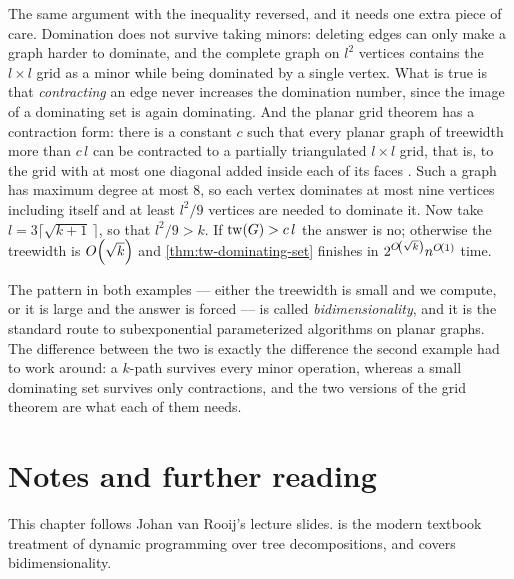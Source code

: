 \begin{example}\label{ex:planar-k-dominating}
The same argument with the inequality reversed, and it needs one extra piece of
care. Domination does not survive taking minors: deleting edges can only make a
graph harder to dominate, and the complete graph on $l^2$ vertices contains the
$l \times l$ grid as a minor while being dominated by a single vertex. What is
true is that \emph{contracting} an edge never increases the domination number,
since the image of a dominating set is again dominating. And the planar grid
theorem has a contraction form: there is a constant $c$ such that every planar
graph of treewidth more than $c\,l$ can be contracted to a partially
triangulated $l \times l$ grid, that is, to the grid with at most one diagonal
added inside each of its faces \citep{FominGolovachThilikos2011}. Such a graph
has maximum degree at most $8$, so each vertex dominates at most nine vertices
including itself and at least $l^2/9$ vertices are needed to dominate it. Now
take $l = 3\lceil \sqrt{k+1}\, \rceil$, so that $l^2/9 > k$. If
$\mathrm{tw}(G) > c\,l$ the answer is no; otherwise the treewidth is $O\!\left(\sqrt k\right)$
and \cref{thm:tw-dominating-set} finishes in $2^{O\!\left(\sqrt k\right)} n^{O\!\left(1\right)}$
time.
\end{example}

The pattern in both examples --- either the treewidth is small and we compute,
or it is large and the answer is forced --- is called \emph{bidimensionality},
and it is the standard route to subexponential parameterized algorithms on
planar graphs. The difference between the two is exactly the difference the
second example had to work around: a $k$-path survives every minor operation,
whereas a small dominating set survives only contractions, and the two versions
of the grid theorem are what each of them needs.

\section{Notes and further reading}
\label{sec:tw-further-reading}

This chapter follows Johan van Rooij's lecture slides.
\citet[Chapter~7]{CyganEtAl2015} is the modern textbook treatment of dynamic
programming over tree decompositions, and \citet[Chapter~11]{CyganEtAl2015}
covers bidimensionality.

